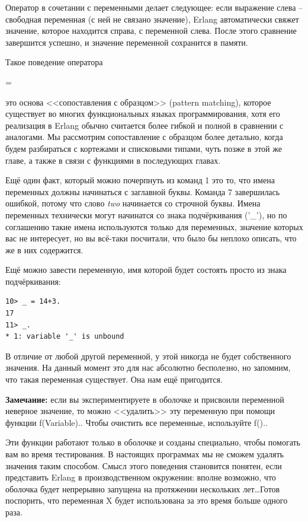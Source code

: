 \documentclass[a4paper,12pt]{report}
\newcommand{\ops}{\colorbox{lgreen}}
\begin{document}
Оператор в сочетании с переменными делает следующее: если выражение слева \--- свободная переменная (с ней не связано значение), Erlang автоматически свяжет значение, которое находится справа, с переменной слева. После этого сравнение завершится успешно, и значение переменной сохранится в памяти.

Такое поведение оператора \ops{\strut=} это основа <<сопоставления с образцом>> (pattern matching), которое существует во многих функциональных языках программирования, хотя его реализация в Erlang обычно считается более гибкой и полной в сравнении с аналогами. Мы рассмотрим сопоставление с образцом более детально, когда будем разбираться с кортежами и списковыми типами, чуть позже в этой же главе, а также в связи с функциями в последующих главах.

Ещё один факт, который можно почерпнуть из команд 1 это то, что имена переменных должны начинаться с заглавной буквы. Команда 7 завершилась ошибкой, потому что слово \emph{two} начинается со строчной буквы. Имена переменных технически могут начинатся со знака подчёркивания ('\_'), но по соглашению такие имена используются только для переменных, значение которых вас не интересует, но вы всё\--таки посчитали, что было бы неплохо описать, что же в них содержится.

Ещё можно завести переменную, имя которой будет состоять просто из знака подчёркивания:
\begin{lstlisting}[style=repl]
10> _ = 14+3.
17
11> _.
* 1: variable '_' is unbound
\end{lstlisting}

В отличие от любой другой переменной, у этой никогда не будет собственного значения. На данный момент это для нас абсолютно бесполезно, но запомним, что такая переменная существует. Она нам ещё пригодится.\\ 
\colorbox{lgray}
{
\begin{minipage}{1.0\linewidth}
\textbf{Замечание:} если вы экспериментируете в оболочке и присвоили переменной неверное значение, то можно <<удалить>> эту переменную при помощи функции \ops{f(Variable).}. Чтобы очистить все переменные, используйте \ops{f().}.
\par 
Эти функции работают только в оболочке и созданы специально, чтобы помогать вам во время тестирования. В настоящих программах мы не сможем удалять значения таким способом. Смысл этого поведения становится понятен, если представить Erlang в производственном окружении: вполне возможно, что оболочка будет непрерывно запущена на протяжении нескольких лет\ldots Готов поспорить, что переменная X будет использована за это время больше одного раза.
\end{minipage}
}
\end{document}
